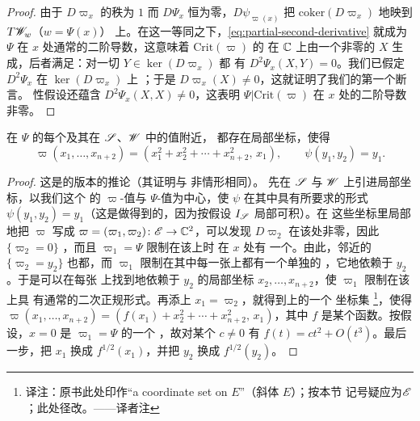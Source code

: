 \begin{proof}
由于 $D\varpi_x$ 的秩为 $1$ 而 $D\Psi_x$ 恒为零，$D\psi_{\varpi(x)}$ 把
$\mathrm{coker}(D\varpi_x)$ \trIsomorphic{}地映到 $T\mathscr{W}_w$（$w=\Psi(x)$）
上。在这一等同之下，\eqref{eq:partial-second-derivative} 就成为 $\Psi$ 在
$x$ 处通常的二阶导数，这意味着 $\mathrm{Crit}(\varpi)$ 的\trTangentSpace{}
在 $\mathbb{C}$ 上由一个非零的 $X$ 生成，后者满足：对一切 $Y\in\ker(D\varpi_x)$ 都
有 $D^2\Psi_x(X,Y)=0$。我们已假定 $D^2\Psi_x$ 在 $\ker(D\varpi_x)$ 上%
\trNondegenerate；于是 $D\varpi_x(X)\neq 0$，这就证明了我们的第一个断言。
\trNondegenerate{}性假设还蕴含 $D^2\Psi_x(X,X)\neq 0$，这表明
$\Psi|\mathrm{Crit}(\varpi)$ 在 $x$ 处的二阶导数非零。
\end{proof}
\begin{lemma}\label{thm:bifibration-normal-form}
在 $\Psi$ 的每个\trCriticalPoint{}及其在 $\mathscr{S}$、$\mathscr{W}$ 中的值附近，
都存在局部\trHolomorphic{}坐标，使得
\begin{equation*}
\varpi(x_1,\dots,x_{n+2})=(x_1^2+x_2^2+\cdots+x_{n+2}^2,\,x_1),
\qquad \psi(y_1,y_2)=y_1.
\end{equation*}
\end{lemma}
\begin{proof}
这是\trHolomorphic\trMorseLemma{}的\trParametrization{}版本的推论（其证明与
非\trParametrization{}情形相同）。
先在 $\mathscr{S}$ 与 $\mathscr{W}$ 上引进\trHolomorphic{}局部坐标，以我们这个\trCriticalPoint{}
的 $\varpi$-值与 $\Psi$-值为中心，使 $\psi$ 在其中具有所要求的形式
$\psi(y_1,y_2)=y_1$（这是做得到的，因为按假设 $I_{\mathscr{S}}$ 局部可积）。在
这些坐标里局部地把 $\varpi$ 写成 $\varpi=(\varpi_1,\varpi_2)\colon\mathscr{E}\to
\mathbb{C}^2$，可以发现 $D\varpi_2$ 在该\trCriticalPoint{}处非零，因此\trLevelSet
$\{\varpi_2=0\}$ \trSmooth，而且 $\varpi_1=\Psi$ 限制在该\trLevelSet{}上时
在 $x$ 处有
一个\trNondegenerate{}\trCriticalPoint。由此，邻近的\trLevelSet{}
$\{\varpi_2=y_2\}$
也都\trSmooth，而 $\varpi_1$ 限制在其中每一张上都有一个单独的\trNondegenerate%
\trCriticalPoint，它\trHolomorphic{}地依赖于 $y_2$。于是可以在每张%
\trLevelSet{}上找到\trHolomorphic{}地依赖于 $y_2$ 的局部坐标
$x_2,\dots,x_{n+2}$，使 $\varpi_1$ 限制在该\trLevelSet{}上具
有通常的二次正规形式。再添上 $x_1=\varpi_2$，就得到\trTotalSpace{}上的一个
坐标集%
\footnote{译注：原书此处印作“a coordinate set on $E$”（斜体 $E$）；按本节
记号疑应为\trTotalSpace{}$\mathscr{E}$；此处径改。——译者注}，使得
$\varpi(x_1,\dots,x_{n+2})=(f(x_1)+x_2^2+\cdots+x_{n+2}^2,\,x_1)$，其中 $f$
是某个\trHolomorphic{}函数。按假设，$x=0$ 是 $\varpi_1=\Psi$ 的一个\trNondegenerate%
\trCriticalPoint，故对某个 $c\neq 0$ 有 $f(t)=ct^2+O(t^3)$。最后一步，把
$x_1$ 换成 $f^{1/2}(x_1)$，并把 $y_2$ 换成 $f^{1/2}(y_2)$。
\end{proof}
